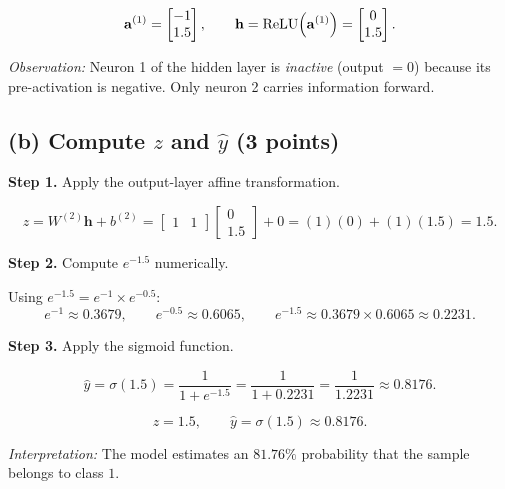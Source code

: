 \documentclass[12pt,a4paper]{article}
\newcommand{\step}[1]{\medskip\noindent\textbf{\textsf{Step #1.}}\enspace}
\begin{document}
\begin{answerbox}
\[
  \mathbf{a}^{(1)} = \begin{bmatrix} -1 \\ 1.5 \end{bmatrix}, \qquad
  \mathbf{h} = \operatorname{ReLU}\!\left(\mathbf{a}^{(1)}\right) = \begin{bmatrix} 0 \\ 1.5 \end{bmatrix}.
\]
\end{answerbox}

\noindent\textit{Observation:} Neuron 1 of the hidden layer is
\emph{inactive} (output $= 0$) because its pre-activation is negative.
Only neuron 2 carries information forward.

\bigskip
\subsection*{(b) Compute $z$ and $\hat{y}$
             \hfill{\normalfont\small(3 points)}}

\step{1} Apply the output-layer affine transformation.

\[
  z = W^{(2)}\mathbf{h} + b^{(2)}
    = \begin{bmatrix} 1 & 1 \end{bmatrix}
      \begin{bmatrix} 0 \\ 1.5 \end{bmatrix}
    + 0
    = (1)(0) + (1)(1.5)
    = 1.5.
\]

\step{2} Compute $e^{-1.5}$ numerically.

Using $e^{-1.5} = e^{-1} \times e^{-0.5}$:
\[
  e^{-1} \approx 0.3679, \qquad
  e^{-0.5} \approx 0.6065, \qquad
  e^{-1.5} \approx 0.3679 \times 0.6065 \approx 0.2231.
\]

\step{3} Apply the sigmoid function.

\[
  \hat{y} = \sigma(1.5)
           = \frac{1}{1 + e^{-1.5}}
           = \frac{1}{1 + 0.2231}
           = \frac{1}{1.2231}
           \approx 0.8176.
\]

\begin{answerbox}
\[
  z = 1.5, \qquad \hat{y} = \sigma(1.5) \approx \boxed{0.8176}.
\]
\end{answerbox}

\noindent\textit{Interpretation:} The model estimates an $81.76\%$ probability
that the sample belongs to class $1$.
\end{document}
